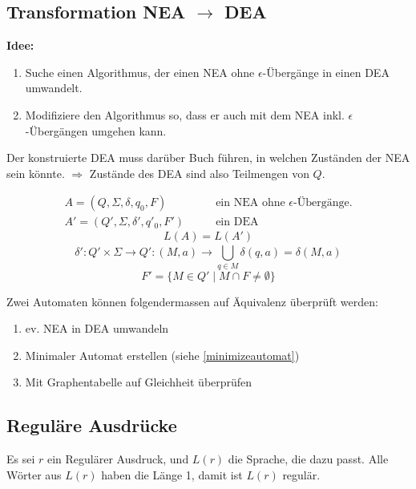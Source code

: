 \documentclass[a4paper]{article}
\begin{document}
\subsection{Transformation NEA $\rightarrow$ DEA}
	\begin{multicols}{2}
	
	\textbf{Idee:}
	\begin{enumerate}
		\item Suche einen Algorithmus, der einen NEA ohne $\epsilon$-Übergänge in einen DEA umwandelt.
		\item Modifiziere den Algorithmus so, dass er auch mit dem NEA inkl. $\epsilon$-Übergängen umgehen kann.
	\end{enumerate}

	Der konstruierte DEA muss darüber Buch führen, in welchen Zuständen der NEA sein könnte.
	$\Rightarrow$ Zustände des DEA sind also Teilmengen von $Q$.
	
	\begin{fsatz}
		\begin{align*}
		A = (Q, \Sigma, \delta, q_0, F)      \qquad & \text{ein NEA ohne $\epsilon$-Übergänge.} \\
		A' = (Q', \Sigma, \delta', q'_0, F') \qquad & \text{ein DEA}
		\end{align*}
		$$L(A) = L(A')$$
		$$\delta': Q' \times \Sigma \rightarrow Q' : (M,a) \rightarrow \bigcup_{q \in M}^{}{\delta(q,a)} = \delta(M,a)$$
		$$F' = \{M \in Q' \mid M \cap F \neq \emptyset \}$$
	\end{fsatz}
	
	\begin{falgo}
	Zwei Automaten können folgendermassen auf Äquivalenz überprüft werden:
	\begin{enumerate}
		\item ev. NEA in DEA umwandeln
		\item Minimaler Automat erstellen (siehe \ref{minimizeautomat})
		\item Mit Graphentabelle auf Gleichheit überprüfen
	\end{enumerate}
	\end{falgo}
	
	\end{multicols}	
	
\subsection{Reguläre Ausdrücke}
	Es sei $r$ ein Regulärer Ausdruck, und $L(r)$ die Sprache, die dazu passt. Alle Wörter aus $L(r)$ haben die Länge 1, damit ist $L(r)$ regulär.
	
\end{document}
